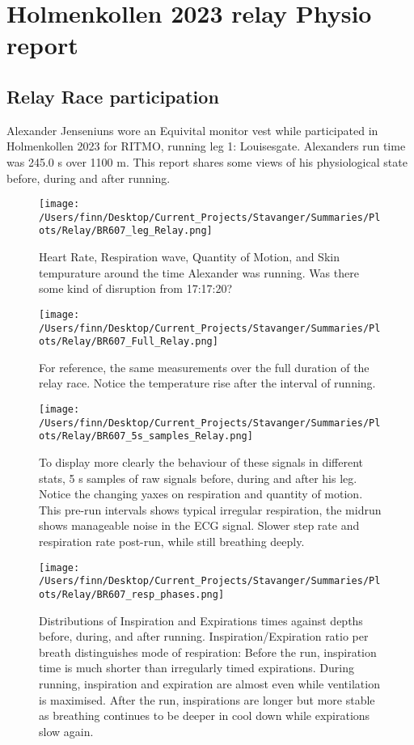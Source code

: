 \section{Holmenkollen 2023 relay Physio report}
\subsection*{Relay Race participation}
 Alexander Jenseniuns wore an Equivital monitor vest while participated in Holmenkollen 2023 for RITMO, running leg 1: Louisesgate. 
 Alexanders run time was 245.0 s over 1100 m. This report shares some views of his physiological state before, during and after running. 
\begin{figure}[h]
\texttt{[image: /Users/finn/Desktop/Current\_Projects/Stavanger/Summaries/Plots/Relay/BR607\_leg\_Relay.png]}
\caption{Heart Rate, Respiration wave, Quantity of Motion, and Skin tempurature around the time Alexander was running. Was there some kind of disruption from 17:17:20?}
\label{leg}
\end{figure}
\begin{sidewaysfigure}[h]
\texttt{[image: /Users/finn/Desktop/Current\_Projects/Stavanger/Summaries/Plots/Relay/BR607\_Full\_Relay.png]}
\caption{For reference, the same measurements over the full duration of the relay race. Notice the temperature rise after the interval of running.}
\label{Full}
\end{sidewaysfigure}
\begin{figure}[h]
\texttt{[image: /Users/finn/Desktop/Current\_Projects/Stavanger/Summaries/Plots/Relay/BR607\_5s\_samples\_Relay.png]}
\caption{To display more clearly the behaviour of these signals in different stats, 5 s samples of raw signals before, during and after his leg. Notice the changing yaxes on respiration and quantity of motion. This pre-run intervals shows typical irregular respiration, the midrun shows manageable noise in the ECG signal. Slower step rate and respiration rate post-run, while still breathing deeply.}
\label{5s}
\end{figure}
\begin{figure}[h]
\texttt{[image: /Users/finn/Desktop/Current\_Projects/Stavanger/Summaries/Plots/Relay/BR607\_resp\_phases.png]}
\caption{Distributions of Inspiration and Expirations times against depths before, during, and after running. Inspiration/Expiration ratio per breath distinguishes mode of respiration: Before the run, inspiration time is much shorter than irregularly timed expirations. During running, inspiration and expiration are almost even while ventilation is maximised. After the run, inspirations are longer but more stable as breathing continues to be deeper in cool down while expirations slow again.}
\label{resp}
\end{figure}



